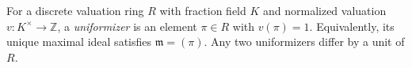 
For a discrete valuation ring $R$ with fraction field $K$ and normalized valuation $v:K^\times\to\mathbb Z$, a \emph{uniformizer} is an element $\pi\in R$ with $v(\pi)=1$. Equivalently, its unique maximal ideal satisfies $\mathfrak m=(\pi)$. Any two uniformizers differ by a unit of $R$.

